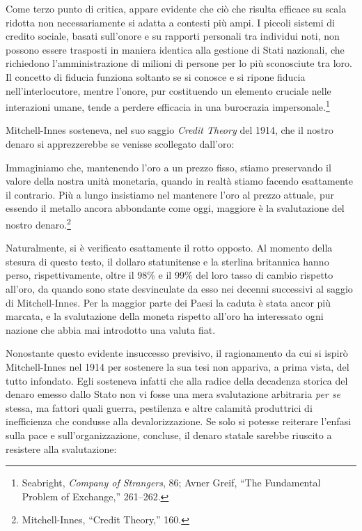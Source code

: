 \documentclass[
  a5paper,
  smalldemyvopaper,10pt,twoside,onecolumn,openright,extrafontsizes,hidelinks]{memoir}
\begin{document}
Come terzo punto di critica, appare evidente che ciò che risulta
efficace su scala ridotta non necessariamente si adatta a contesti più
ampi. I piccoli sistemi di credito sociale, basati sull'onore e su
rapporti personali tra individui noti, non possono essere trasposti in
maniera identica alla gestione di Stati nazionali, che richiedono
l'amministrazione di milioni di persone per lo più sconosciute tra loro.
Il concetto di fiducia funziona soltanto se si conosce e si ripone
fiducia nell'interlocutore, mentre l'onore, pur costituendo un elemento
cruciale nelle interazioni umane, tende a perdere efficacia in una
burocrazia impersonale.\footnote{Seabright, \emph{Company of Strangers},
  86; Avner Greif, ``The Fundamental Problem of Exchange,'' 261--262.}

Mitchell-Innes sosteneva, nel suo saggio \emph{Credit Theory} del 1914,
che il nostro denaro si apprezzerebbe se venisse scollegato dall'oro:

Immaginiamo che, mantenendo l'oro a un prezzo fisso, stiamo preservando
il valore della nostra unità monetaria, quando in realtà stiamo facendo
esattamente il contrario. Più a lungo insistiamo nel mantenere l'oro al
prezzo attuale, pur essendo il metallo ancora abbondante come oggi,
maggiore è la svalutazione del nostro denaro.\footnote{Mitchell-Innes,
  ``Credit Theory,'' 160.}

Naturalmente, si è verificato esattamente il rotto opposto. Al momento
della stesura di questo testo, il dollaro statunitense e la sterlina
britannica hanno perso, rispettivamente, oltre il 98\% e il 99\% del
loro tasso di cambio rispetto all'oro, da quando sono state desvinculate
da esso nei decenni successivi al saggio di Mitchell-Innes. Per la
maggior parte dei Paesi la caduta è stata ancor più marcata, e la
svalutazione della moneta rispetto all'oro ha interessato ogni nazione
che abbia mai introdotto una valuta fiat.

Nonostante questo evidente insuccesso previsivo, il ragionamento da cui
si ispirò Mitchell-Innes nel 1914 per sostenere la sua tesi non
appariva, a prima vista, del tutto infondato. Egli sosteneva infatti che
alla radice della decadenza storica del denaro emesso dallo Stato non vi
fosse una mera svalutazione arbitraria \emph{per se} stessa, ma fattori
quali guerra, pestilenza e altre calamità produttrici di inefficienza
che condusse alla devalorizzazione. Se solo si potesse reiterare
l'enfasi sulla pace e sull'organizzazione, concluse, il denaro statale
sarebbe riuscito a resistere alla svalutazione:
\end{document}
